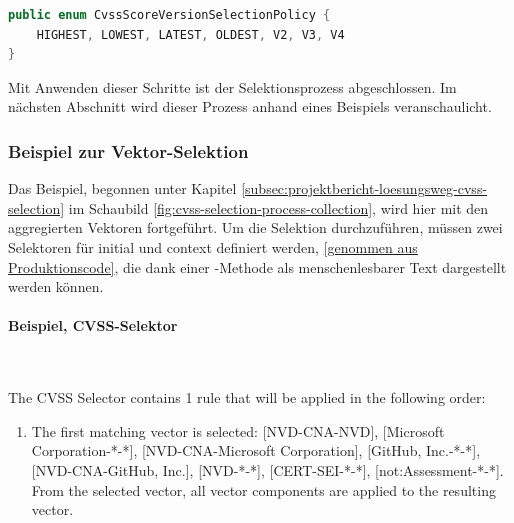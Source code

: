 \begin{lstlisting}[language=Java, label={lst:cvss-selector-version-selector}, caption={Gültige Werte für die Versions-Selektion}]
public enum CvssScoreVersionSelectionPolicy {
    HIGHEST, LOWEST, LATEST, OLDEST, V2, V3, V4
}
\end{lstlisting}

Mit Anwenden dieser Schritte ist der Selektionsprozess abgeschlossen.
Im nächsten Abschnitt wird dieser Prozess anhand eines Beispiels veranschaulicht.

\newpage
\subsubsection{Beispiel zur Vektor-Selektion} \label{subsubsec:projektbericht-loesungsweg-cvss-selection-example}

Das Beispiel, begonnen unter Kapitel \ref{subsec:projektbericht-loesungsweg-cvss-selection} im Schaubild \ref{fig:cvss-selection-process-collection}, wird hier mit den aggregierten Vektoren fortgeführt.
Um die Selektion durchzuführen, müssen zwei Selektoren für initial und context definiert werden, \href{https://github.com/org-metaeffekt/metaeffekt-core/blob/1f0a1f6ac5e8343e10ea182794faf534bdfb3310/libraries/ae-inventory-processor/src/main/java/org/metaeffekt/core/inventory/processor/report/configuration/CentralSecurityPolicyConfiguration.java\#L568}{[genommen aus Produktionscode]}, die dank einer -Methode als menschenlesbarer Text dargestellt werden können.

\paragraph{Beispiel, CVSS-Selektor } \label{par:projektbericht-loesungsweg-cvss-selection-example-selector-initial}

\

\noindent The CVSS Selector contains 1 rule that will be applied in the following order:
\begin{enumerate}[noitemsep]
    \item The first matching vector is selected: [NVD-CNA-NVD], [Microsoft Corporation-*-*], [NVD-CNA-Microsoft Corporation], [GitHub, Inc.-*-*], [NVD-CNA-GitHub, Inc.], [NVD-*-*], [CERT-SEI-*-*], [not:Assessment-*-*]. From the selected vector, all vector components are applied to the resulting vector.
\end{enumerate}

